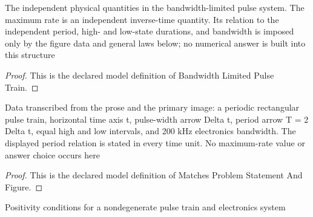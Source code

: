 \begin{definition}
  \label{def:physics:phyx-mini-0649:phyxminiproblems-problemphyxmini0649-bandwidthlimitedpulsetrain}
  The independent physical quantities in the bandwidth-limited pulse system. The maximum rate is an independent inverse-time quantity. Its relation to the independent period, high- and low-state durations, and bandwidth is imposed only by the figure data and general laws below; no numerical answer is built into this structure
\end{definition}
\begin{proof}
  This is the declared model definition of Bandwidth Limited Pulse Train.
\end{proof}
\begin{definition}
  \label{def:physics:phyx-mini-0649:phyxminiproblems-problemphyxmini0649-matchesproblemstatementandfigure}
  Data transcribed from the prose and the primary image: a periodic rectangular pulse train, horizontal time axis t, pulse-width arrow Delta t, period arrow T = 2 Delta t, equal high and low intervals, and 200 kHz electronics bandwidth. The displayed period relation is stated in every time unit. No maximum-rate value or answer choice occurs here
\end{definition}
\begin{proof}
  This is the declared model definition of Matches Problem Statement And Figure.
\end{proof}
\begin{definition}
  \label{def:physics:phyx-mini-0649:phyxminiproblems-problemphyxmini0649-hasphysicalpulsetrainparameters}
  Positivity conditions for a nondegenerate pulse train and electronics system
\end{definition}
